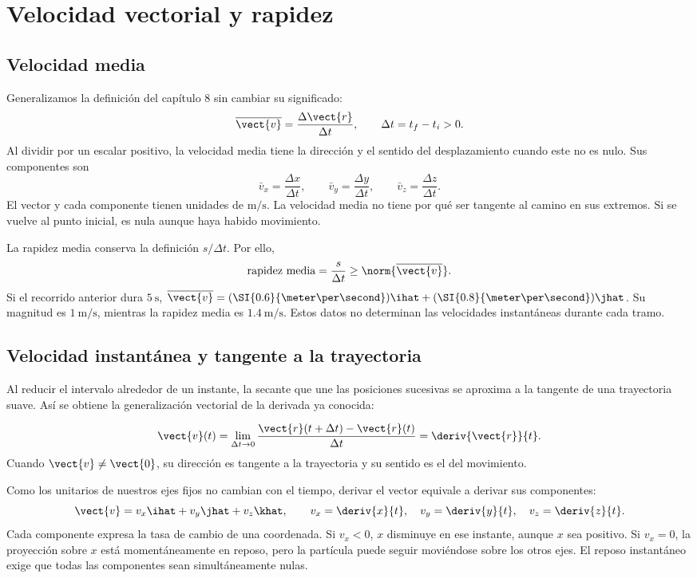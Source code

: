 \section{Velocidad vectorial y rapidez}

\subsection{Velocidad media}

Generalizamos la definición del capítulo 8 sin cambiar su significado:
\[ \overline{\vect{v}}=\frac{\Delta\vect{r}}{\Delta t},
\qquad \Delta t=t_f-t_i>0. \]
Al dividir por un escalar positivo, la velocidad media tiene la dirección
y el sentido del desplazamiento cuando este no es nulo. Sus componentes son
\[ \bar v_x=\frac{\Delta x}{\Delta t},\qquad
\bar v_y=\frac{\Delta y}{\Delta t},\qquad
\bar v_z=\frac{\Delta z}{\Delta t}. \]
El vector y cada componente tienen unidades de \(\si{\meter\per\second}\).
La velocidad media no tiene por qué ser tangente al camino en sus extremos.
Si se vuelve al punto inicial, es nula aunque haya habido movimiento.

La rapidez media conserva la definición \(s/\Delta t\). Por ello,
\[ \text{rapidez media}=\frac{s}{\Delta t}
\geq\norm{\overline{\vect{v}}}. \]
Si el recorrido anterior dura \(\SI{5}{\second}\),
\(\overline{\vect{v}}=(\SI{0.6}{\meter\per\second})\ihat
+(\SI{0.8}{\meter\per\second})\jhat\). Su magnitud es
\(\SI{1}{\meter\per\second}\), mientras la rapidez media es
\(\SI{1.4}{\meter\per\second}\). Estos datos no determinan las velocidades
instantáneas durante cada tramo.

\subsection{Velocidad instantánea y tangente a la trayectoria}

Al reducir el intervalo alrededor de un instante, la secante que une las
posiciones sucesivas se aproxima a la tangente de una trayectoria suave.
Así se obtiene la generalización vectorial de la derivada ya conocida:
\begin{definicion}
\[ \vect{v}(t)=\lim_{\Delta t\to0}
\frac{\vect{r}(t+\Delta t)-\vect{r}(t)}{\Delta t}
=\deriv{\vect{r}}{t}. \]
Cuando \(\vect{v}\ne\vect{0}\), su dirección es tangente a la trayectoria
y su sentido es el del movimiento.
\end{definicion}

Como los unitarios de nuestros ejes fijos no cambian con el tiempo,
derivar el vector equivale a derivar sus componentes:
\[ \vect{v}=v_x\ihat+v_y\jhat+v_z\khat,
\qquad v_x=\deriv{x}{t},\quad v_y=\deriv{y}{t},\quad v_z=\deriv{z}{t}. \]
Cada componente expresa la tasa de cambio de una coordenada. Si \(v_x<0\),
\(x\) disminuye en ese instante, aunque \(x\) sea positivo. Si \(v_x=0\),
la proyección sobre \(x\) está momentáneamente en reposo, pero la partícula
puede seguir moviéndose sobre los otros ejes. El reposo instantáneo exige
que todas las componentes sean simultáneamente nulas.

